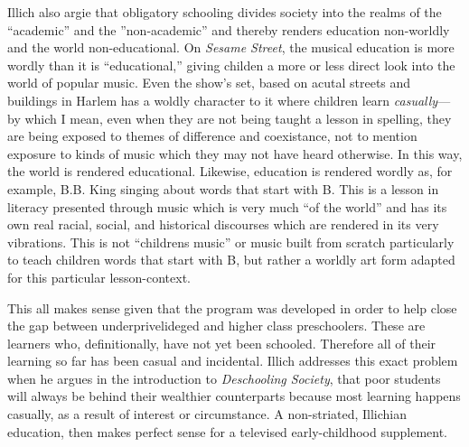 \documentclass[12pt,letterpaper]{article}
\begin{document}
	Illich also argie that obligatory schooling divides society into the 
	realms of the ``academic'' and the ''non-academic'' and thereby renders
	education non-worldly and the world non-educational.\autocite[12]
	{Illich} On \textit{Sesame Street}, the musical education is more wordly
	than it is ``educational,'' giving childen a more or less direct look 
	into the world of popular music. Even the show's set, based on acutal
	streets and buildings in Harlem\autocite[154, Inspired by a PSA on the 
	urban life of children as part of the "Give a Damn" ad campaign by the 
	New York Urban Coalition, Jon Stone decided that the show have an urban
	set. This came in part from the realization that "For a preschool child
	in Harlem, the street is where the action is. As often as not she is 
	housebound all day while her mother works, and, from the vantage point 
	of her apartment, the sidewalk outside must look like Utopia. Outside 
	there are kids hollering, jumping double Dutch, running through the open
	hydrants, playing stickball. Our set had to be an inner-city street, and
	more particularly it had to be a brownstone so that the cast and kids 
	could 'stoop' in the age-old New York tradition, sitting on the front 
	steps and watching the world go by." The set was modeled after the 
	atual streets and builings of Harlem by set designer Charles Rosen. In 
	particular, Stone wantd a movie style set, in all its detail, not the 
	cardboard and canvas of childrens television at the time.]{Davis} has a
	 woldly character to it where children learn \textit{casually}---by 
	which I mean, even when they are not being taught a lesson in spelling,
	they are being exposed to themes of difference and coexistance, not to 
	mention exposure to kinds of music which they may not have heard 
	otherwise. In this way, the world is rendered educational. Likewise, 
	education is rendered wordly as, for example, B.B. King singing about 
	words that start with B. This is a lesson in literacy presented through
	music which is very much ``of the world'' and has its own real racial, 
	social, and historical discourses which are rendered in its very 
	vibrations. This is not ``childrens music'' or music built from scratch
	particularly to teach children words that start with B, but rather a 
	worldly art form adapted for this particular lesson-context.


	This all makes sense given that the program was developed in order to 
	help close the gap between underprivelideged and higher class 
	preschoolers\autocite[sec. 1]{Cooney}. These are learners who, 
	definitionally, have not yet been schooled. Therefore all of their 
	learning so far has been casual and incidental. Illich addresses this 
	exact problem when he argues in the introduction to \textit{Deschooling
	Society}, that poor students will always be behind their wealthier
	counterparts\autocite[5]{Illich} because most learning happens casually,
	as a result of interest or circumstance.\autocite[7]{Illich} 
	A non-striated, Illichian education, then makes perfect sense for
	a televised early-childhood supplement.
\end{document}
